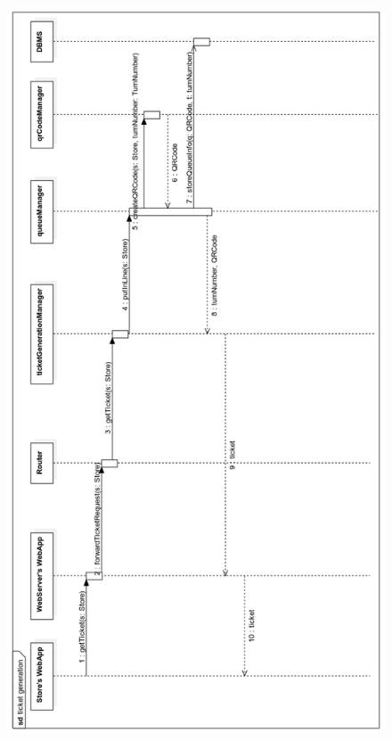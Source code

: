 \documentclass{article}
\begin{document}
\begin{figure}[H]
  \includegraphics[width=\linewidth]{ticketRT.png}
  
\end{figure}
\end{document}
